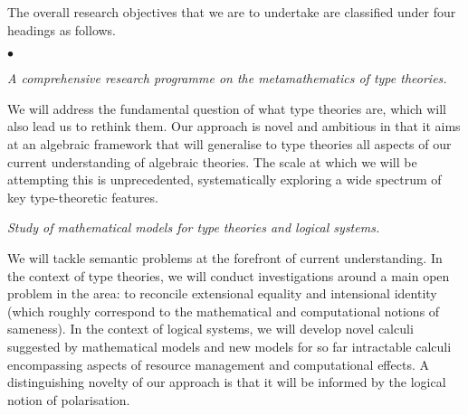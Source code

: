 \documentclass[11pt,twocolumn]{article}
\newenvironment{myitemize}
  {\begin{list}{$\bullet$}
  {\setlength{\topsep}{2pt}
   \setlength{\partopsep}{2pt}
   \setlength{\itemsep}{2.5pt}
   \setlength{\parsep}{2.5pt}
   \setlength{\leftmargin}{1em}
   \setlength{\labelwidth}{.5em}}}
  {\end{list}}
\newcommand{\hidewiring}[1]{}
\begin{document}
The overall research objectives that we are to undertake are classified
under four headings as follows.
\begin{myitemize}
\item[{\bfseries 1\enspace Foundations:}]\mbox{}\enspace\thinspace 
%
  \emph{A comprehensive research programme on the metamathematics of type
    theories.}

  We will address the fundamental question of what type theories are,
  which will also lead us to rethink them.  Our approach is novel and
  ambitious in that it aims at an algebraic framework that will generalise
  to type theories all aspects of our current understanding of algebraic
  theories. %
  The scale at which we will be attempting this is unprecedented,
  systematically exploring a wide spectrum of key type-theoretic features.

\item[{\bfseries 2\enspace Models:}]\mbox{}\enspace\thinspace
%  
  \emph{Study of mathematical models for type theories and logical systems.}

  We will tackle semantic problems at the forefront of current understanding.
  In the context of type theories, we will conduct investigations around a
  main open problem in the area: to reconcile extensional equality and
  intensional identity (which roughly correspond to the mathematical and
  computational notions of sameness).  
  In the context of logical systems, we will develop novel calculi suggested
  by mathematical models and new models for so far intractable calculi
  encompassing aspects of resource management and computational effects.  A
  distinguishing novelty of our approach is that it will be informed by the
  logical notion of polarisation.


\end{myitemize}
\end{document}
